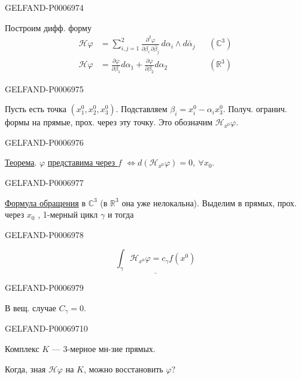 \begin{GelfandAdjacentEvidence}{GELFAND-P000697}{4}


Построим дифф. форму
\[
\begin{aligned}
\mathcal H\varphi
&=\sum_{i,j=1}^{2}
\frac{\partial^2\varphi}{\partial\beta_i\,\partial\bar{\beta}_j}\,
d\alpha_i\wedge d\bar{\alpha}_j
&&(\mathbb C^3)\\
\mathcal H\varphi
&=\frac{\partial\varphi}{\partial\beta_1}d\alpha_1
+\frac{\partial\varphi}{\partial\beta_2}d\alpha_2
&&(\mathbb R^3)
\end{aligned}
\]
\end{GelfandAdjacentEvidence}
\begin{GelfandAdjacentEvidence}{GELFAND-P000697}{5}


Пусть есть точка \((x_1^0,x_2^0,x_3^0)\).
Подставляем \(\beta_i=x_i^0-\alpha_i x_3^0\).
Получ. огранич. формы на прямые, прох. через эту точку.
Это обозначим \(\mathcal H_{x^0}\varphi\).
\end{GelfandAdjacentEvidence}
\begin{GelfandAdjacentEvidence}{GELFAND-P000697}{6}


\underline{Теорема}.
\(\varphi\) \underline{представима через \(f\)}
\(\Longleftrightarrow d(\mathcal H_{x^0}\varphi)=0,\ \forall x_0\).
\end{GelfandAdjacentEvidence}
\begin{GelfandAdjacentEvidence}{GELFAND-P000697}{7}


\underline{Формула обращения} в \(\mathbb C^3\) (в \(\mathbb R^3\) она уже нелокальна).
Выделим в прямых, прох. через \(x_0\) , 1-мерный цикл \(\gamma\) и тогда
\end{GelfandAdjacentEvidence}
\begin{GelfandAdjacentEvidence}{GELFAND-P000697}{8}

\[
\underline{\int_\gamma \mathcal H_{x^0}\varphi=c_\gamma f(x^0)}
\]
\end{GelfandAdjacentEvidence}
\begin{GelfandAdjacentEvidence}{GELFAND-P000697}{9}

В вещ. случае \(C_\gamma=0\).
\end{GelfandAdjacentEvidence}
\begin{GelfandAdjacentEvidence}{GELFAND-P000697}{10}


Комплекс \(K\) --- 3-мерное мн-зие прямых.

Когда, зная \(\mathcal H\varphi\) на \(K\), можно восстановить \(\varphi\)?
\end{GelfandAdjacentEvidence}


